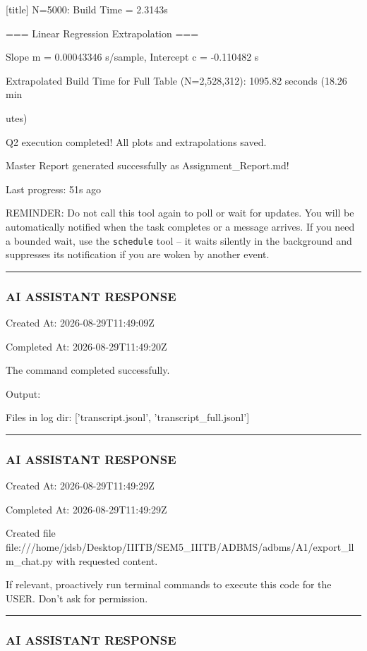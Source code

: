 \documentclass[11pt,a4paper]{article}
\begin{document}
{[title] N=5000: Build Time = 2.3143s

=== Linear Regression Extrapolation ===

Slope m = 0.00043346 s/sample, Intercept c = -0.110482 s

Extrapolated Build Time for Full Table (N=2,528,312): 1095.82 seconds (18.26 min

utes)

Q2 execution completed! All plots and extrapolations saved.

Master Report generated successfully as Assignment\_Report.md!


Last progress: 51s ago



REMINDER: Do not call this tool again to poll or wait for updates. You will be automatically notified when the task completes or a message arrives. If you need a bounded wait, use the \texttt{schedule} tool -- it waits silently in the background and suppresses its notification if you are woken by another event.


\hrule

\subsubsection{AI ASSISTANT RESPONSE}

Created At: 2026-08-29T11:49:09Z

Completed At: 2026-08-29T11:49:20Z


The command completed successfully.

Output:

Files in log dir: ['transcript.jsonl', 'transcript\_full.jsonl']


\hrule

\subsubsection{AI ASSISTANT RESPONSE}

Created At: 2026-08-29T11:49:29Z

Completed At: 2026-08-29T11:49:29Z

Created file file:///home/jdsb/Desktop/IIITB/SEM5\_IIITB/ADBMS/adbms/A1/export\_llm\_chat.py with requested content.

If relevant, proactively run terminal commands to execute this code for the USER. Don't ask for permission.


\hrule

\subsubsection{AI ASSISTANT RESPONSE}

}
\end{document}
